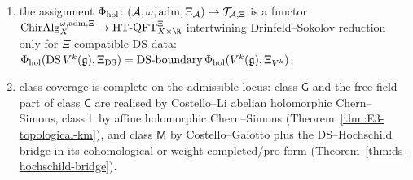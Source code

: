 \begin{theorem}
\begin{enumerate}[label=\textup{(\roman*)}]
	 Convention~\textup{\ref{conv:chd-e3-chiral-meaning}} is part of
	 the admissible datum;
\item\label{item:uh-functor}
 the assignment
 $\Phi_{\mathrm{hol}}\colon
 (\mathcal{A},\omega,\mathrm{adm},\Xi_{\mathcal{A}})\mapsto\mathcal{T}_{\mathcal{A},\Xi}$
 is a functor
	 $\mathrm{ChirAlg}^{\omega,\mathrm{adm},\Xi}_X\to
	 \mathrm{HT\text{-}QFT}^{\Xi}_{X\times\R}$
	 intertwining Drinfeld--Sokolov reduction only for
	 \(\Xi\)-compatible DS data:
 $\Phi_{\mathrm{hol}}(\mathrm{DS}\,V^k(\mathfrak{g}),\Xi_{\mathrm{DS}})
 =
 \mathrm{DS\text{-}boundary}\,
 \Phi_{\mathrm{hol}}(V^k(\mathfrak{g}),\Xi_{V^k})$;
\item\label{item:uh-coverage}
	 class coverage is complete on the admissible locus: class
	 $\mathsf{G}$ and the free-field part of class $\mathsf{C}$ are
	 realised by Costello--Li abelian holomorphic Chern--Simons, class
	 $\mathsf{L}$ by affine holomorphic Chern--Simons
	 \textup{(}Theorem~\textup{\ref{thm:E3-topological-km}}\textup{)},
	 and class $\mathsf{M}$ by Costello--Gaiotto plus the
	 DS--Hochschild bridge in its cohomological or
	 weight-completed/pro form
	 \textup{(}Theorem~\textup{\ref{thm:ds-hochschild-bridge}}\textup{)}.
\end{enumerate}
\end{theorem}

